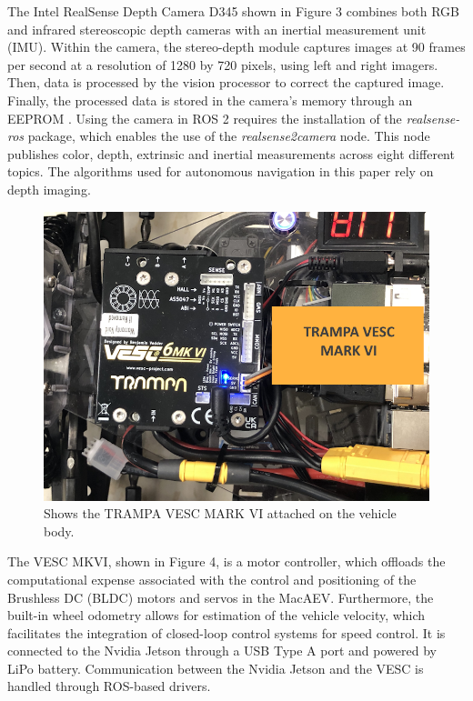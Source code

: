 \documentclass[conference]{IEEEtran}
\begin{document}
The Intel RealSense Depth Camera D345 shown in Figure 3 combines both RGB and infrared stereoscopic depth cameras with an inertial measurement unit (IMU). Within the camera, the stereo-depth module captures images at 90 frames per second at a resolution of 1280 by 720 pixels, using left and right imagers. Then, data is processed by the vision processor to correct the captured image. Finally, the processed data is stored in the camera's memory through an EEPROM \cite{b7}. Using the camera in ROS 2 requires the installation of the \textit{realsense-ros} package, which enables the use of the \textit{realsense2\textunderscore camera} node. This node publishes color, depth, extrinsic and inertial measurements across eight different topics. The algorithms used for autonomous navigation in this paper rely on depth imaging. 

\begin{figure}
    \centering
    \includegraphics[scale=0.2]{motor_ctrl_diagram.png}
    \caption{Shows the TRAMPA VESC MARK VI attached on the vehicle body.}
    \label{Figure 4}
\end{figure}


The VESC MKVI, shown in Figure 4, is a motor controller, which offloads the computational expense associated with the control and positioning of the Brushless DC (BLDC) motors and servos in the MacAEV. Furthermore, the built-in wheel odometry allows for estimation of the vehicle velocity, which facilitates the integration of closed-loop control systems for speed control. It is connected to the Nvidia Jetson through a USB Type A port and powered by LiPo battery. Communication between the Nvidia Jetson and the VESC is handled through ROS-based drivers. 
\end{document}
